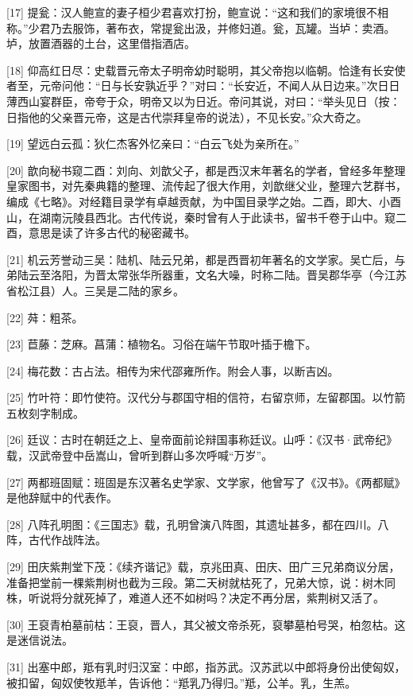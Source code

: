 \documentclass[12pt,UTF8]{ctexbook}
\begin{document}
[17] 提瓮：汉人鲍宣的妻子桓少君喜欢打扮，鲍宣说：“这和我们的家境很不相称。”少君乃去服饰，著布衣，常提瓮出汲，并修妇道。瓮，瓦罐。当垆：卖酒。垆，放置酒器的土台，这里借指酒店。

[18] 仰高红日尽：史载晋元帝太子明帝幼时聪明，其父帝抱以临朝。恰逢有长安使者至，元帝问他：“日与长安孰近乎？”对曰：“长安近，不闻人从日边来。”次日日薄西山宴群臣，帝夸于众，明帝又以为日近。帝问其说，对曰：“举头见日（按：日指他的父亲晋元帝，这是古代崇拜皇帝的说法），不见长安。”众大奇之。

[19] 望远白云孤：狄仁杰客外忆亲曰：“白云飞处为亲所在。”

[20] 歆向秘书窥二酉：刘向、刘歆父子，都是西汉末年著名的学者，曾经多年整理皇家图书，对先秦典籍的整理、流传起了很大作用，刘歆继父业，整理六艺群书，编成《七略》。对经籍目录学有卓越贡献，为中国目录学之始。二酉，即大、小酉山，在湖南沅陵县西北。古代传说，秦时曾有人于此读书，留书千卷于山中。窥二酉，意思是读了许多古代的秘密藏书。

[21] 机云芳誉动三吴：陆机、陆云兄弟，都是西晋初年著名的文学家。吴亡后，与弟陆云至洛阳，为晋太常张华所器重，文名大噪，时称二陆。晋吴郡华亭（今江苏省松江县）人。三吴是二陆的家乡。

[22] 荈：粗茶。

[23] 苣藤：芝麻。菖蒲：植物名。习俗在端午节取叶插于檐下。

[24] 梅花数：古占法。相传为宋代邵雍所作。附会人事，以断吉凶。

[25] 竹叶符：即竹使符。汉代分与郡国守相的信符，右留京师，左留郡国。以竹箭五枚刻字制成。

[26] 廷议：古时在朝廷之上、皇帝面前论辩国事称廷议。山呼：《汉书·武帝纪》载，汉武帝登中岳嵩山，曾听到群山多次呼喊“万岁”。

[27] 两都班固赋：班固是东汉著名史学家、文学家，他曾写了《汉书》。《两都赋》是他辞赋中的代表作。

[28] 八阵孔明图：《三国志》载，孔明曾演八阵图，其遗址甚多，都在四川。八阵，古代作战阵法。

[29] 田庆紫荆堂下茂：《续齐谐记》载，京兆田真、田庆、田广三兄弟商议分居，准备把堂前一棵紫荆树也截为三段。第二天树就枯死了，兄弟大惊，说：树木同株，听说将分就死掉了，难道人还不如树吗？决定不再分居，紫荆树又活了。

[30] 王裒青柏墓前枯：王裒，晋人，其父被文帝杀死，裒攀墓柏号哭，柏忽枯。这是迷信说法。

[31] 出塞中郎，羝有乳时归汉室：中郎，指苏武。汉苏武以中郎将身份出使匈奴，被扣留，匈奴使牧羝羊，告诉他：“羝乳乃得归。”羝，公羊。乳，生羔。
\end{document}
